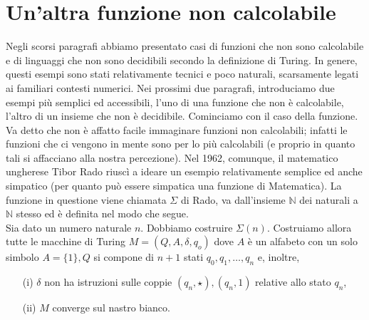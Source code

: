 \section{Un'altra funzione non calcolabile}

Negli scorsi paragrafi
abbiamo presentato casi di funzioni che non sono calcolabile e di linguaggi che
non sono decidibili secondo la definizione di Turing. In genere, questi esempi
sono stati relativamente tecnici e poco naturali, scarsamente legati ai
familiari contesti numerici. Nei prossimi due paragrafi, introduciamo due esempi
più semplici ed accessibili, l'uno di una funzione che non è calcolabile,
l'altro di un insieme che non è decidibile. Cominciamo con il caso della
funzione. Va detto che non è affatto facile immaginare funzioni non calcolabili;
infatti le funzioni che ci vengono in mente sono per lo più calcolabili (e
proprio in quanto tali si affacciano alla nostra percezione). Nel 1962,
comunque, il matematico ungherese Tibor Rado riuscì a ideare un esempio
relativamente semplice ed anche simpatico (per quanto può essere simpatica una
funzione di Matematica). La funzione in questione viene chiamata $\Sigma$ di
Rado, va dall'insieme $\mathbb{N}$ dei naturali a $\mathbb{N}$ stesso ed è
definita nel modo che segue.\\
Sia dato un numero naturale $n$. Dobbiamo costruire
$\Sigma(n)$. Costruiamo allora tutte le macchine di Turing $M=\left(Q, A,
    \delta, q_o\right)$ dove $A$ è un alfabeto con un solo simbolo $A=\{1\}, Q$ si
compone di $n+1$ stati $q_0, q_1, \ldots, q_n$ e, inoltre,

\begin{enumerate}
    \item[(i)]$\delta$ non ha istruzioni sulle coppie $\left(q_n,
        \star\right),\left(q_n, 1\right)$ relative allo stato $q_n$,
    \item[(ii)] $M$ converge sul nastro bianco.
\end{enumerate}

